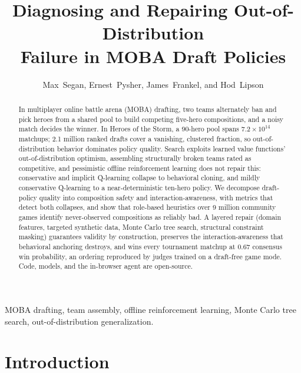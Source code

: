 \documentclass[journal]{IEEEtran}
\newif\ifanonymous
\begin{document}
\title{Diagnosing and Repairing Out-of-Distribution\\ Failure in MOBA Draft Policies}
\ifanonymous
\author{Anonymous Authors}
\else
\author{Max~Segan, Ernest~Pysher, James~Frankel, and Hod~Lipson}
\fi
\maketitle

\begin{abstract}
In multiplayer online battle arena (MOBA) drafting, two teams alternately ban and pick heroes from a shared pool to build competing five-hero compositions, and a noisy match decides the winner. In Heroes of the Storm, a 90-hero pool spans $7.2 \times 10^{14}$ matchups; 2.1 million ranked drafts cover a vanishing, clustered fraction, so out-of-distribution behavior dominates policy quality. Search exploits learned value functions' out-of-distribution optimism, assembling structurally broken teams rated as competitive, and pessimistic offline reinforcement learning does not repair this: conservative and implicit Q-learning collapse to behavioral cloning, and mildly conservative Q-learning to a near-deterministic ten-hero policy. We decompose draft-policy quality into composition safety and interaction-awareness, with metrics that detect both collapses, and show that role-based heuristics over 9 million community games identify never-observed compositions as reliably bad. A layered repair (domain features, targeted synthetic data, Monte Carlo tree search, structural constraint masking) guarantees validity by construction, preserves the interaction-awareness that behavioral anchoring destroys, and wins every tournament matchup at 0.67 consensus win probability, an ordering reproduced by judges trained on a draft-free game mode. Code, models, and the in-browser agent are open-source.
\end{abstract}

\begin{IEEEkeywords}
MOBA drafting, team assembly, offline reinforcement learning, Monte Carlo tree search, out-of-distribution generalization.
\end{IEEEkeywords}

\section{Introduction}
\end{document}
